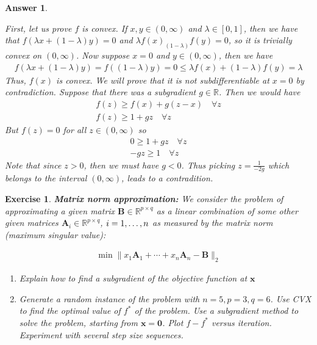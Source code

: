 \documentclass[12pt]{article}
\theoremstyle{colon}
\newtheorem{exercise}{Exercise}
\newtheorem*{answer}{Answer}
\begin{document}
\begin{answer}
  \

  First, let us prove $f$ is convex. If $x, y \in (0, \infty)$ and $\lambda \in [0,1]$, then we have that $f(\lambda x + (1-\lambda)y) = 0$ and $\lambda f(x) _ (1-\lambda)f(y) = 0$, so it is trivially convex on $(0,\infty)$. Now suppose $x = 0$ and $y \in (0, \infty)$, then we have
  \begin{gather*}
    f(\lambda x + (1-\lambda)y) = f((1-\lambda)y) = 0 \leq \lambda f(x) + (1-\lambda) f(y) = \lambda
  \end{gather*}
  Thus, $f(x)$ is convex. We will prove that it is not subdifferentiable at $x = 0$ by contradiction. Suppose that there was a subgradient $g \in \mathbb{R}$. Then we would have
  \begin{gather*}
    f(z) \geq f(x) + g (z-x) \quad \forall z \\
    f(z) \geq 1 + gz \quad \forall z
  \end{gather*}
  But $f(z) = 0$ for all $z \in (0,\infty)$ so
  \begin{gather*}
    0 \geq 1 + gz \quad \forall z \\
    -gz \geq 1 \quad \forall z
  \end{gather*}
  Note that since $z > 0$, then we must have $g < 0$. Thus picking $z = \frac{1}{-2g}$ which belongs to the interval $(0, \infty)$, leads to a contradition.
\end{answer}

\clearpage

\begin{exercise}
  \textbf{Matrix norm approximation:} We consider the problem of approximating a given matrix $\bm{B} \in \mathbb{R}^{p \times q}$ as a linear combination of some other given matrices $\bm{A}_i \in \mathbb{R}^{p \times q}$, $i = 1, \mathellipsis, n$ as measured by the matrix norm (maximum singular value):

  \begin{gather*}
    \min \lVert x_1 \bm{A}_1 + \cdots + x_n \bm{A}_n - \bm{B} \rVert_2
  \end{gather*}

  \begin{enumerate}[label=\alph*)]
    \item Explain how to find a subgradient of the objective function at $\bm{x}$
    \item Generate a random instance of the problem with $n = 5, p = 3, q = 6$. Use CVX to find the optimal value of $f^*$ of the problem. Use a subgradient method to solve the problem, starting from $\bm{x} = \bm{0}$. Plot $f - f^*$ versus iteration. Experiment with several step size sequences.
  \end{enumerate}

\end{exercise}
\end{document}
